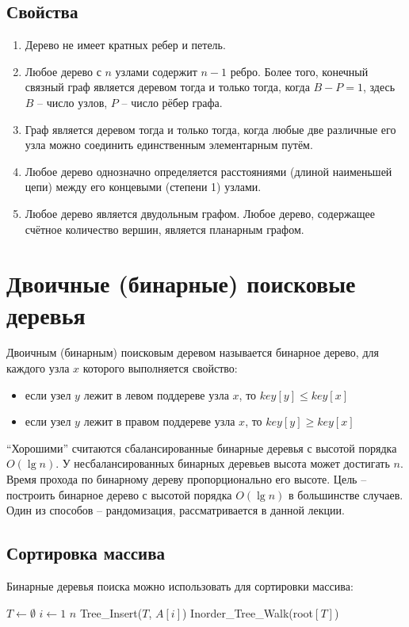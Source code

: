 \documentclass[11pt]{article}
\begin{document}
\subsection{Свойства}
\begin{enumerate}
\item Дерево не имеет кратных ребер и петель.
\item Любое дерево с $n$ узлами содержит $n-1$ ребро. Более того, конечный связный граф является деревом тогда и только тогда, когда $B-P = 1$, здесь $B$ -- число узлов, $P$ -- число рёбер графа.
\item Граф является деревом тогда и только тогда, когда любые две различные его узла можно соединить единственным элементарным путём.
\item Любое дерево однозначно определяется расстояниями (длиной наименьшей цепи) между его концевыми (степени 1) узлами.
\item Любое дерево является двудольным графом. Любое дерево, содержащее счётное количество вершин, является планарным графом.
\end{enumerate}

\section{Двоичные (бинарные) поисковые деревья}
Двоичным (бинарным) поисковым деревом называется бинарное дерево, для каждого узла $x$ которого выполняется свойство:
\begin{itemize}
\item если узел $y$ лежит в левом поддереве узла $x$, то $key[y] \leqslant key[x]$
\item если узел $y$ лежит в правом поддереве узла $x$, то $key[y] \geqslant key[x]$
\end{itemize}

``Хорошими'' считаются сбалансированные бинарные деревья с высотой порядка $O(\lg n)$. У несбалансированных бинарных деревьев высота может достигать $n$. Время прохода по бинарному дереву пропорционально его высоте. Цель -- построить бинарное дерево с высотой порядка $O(\lg n)$ в большинстве случаев. Один из способов -- рандомизация, рассматривается в данной лекции.

\subsection{Сортировка массива}
Бинарные деревья поиска можно использовать для сортировки массива:
\begin{codebox}
\li $T \gets \emptyset $
\li \For $i \gets 1$ \To $n$
\li \Do Tree\_Insert($T$, $A[i]$)
  \End
\li Inorder\_Tree\_Walk(root$[T]$)
\end{codebox}
\end{document}
